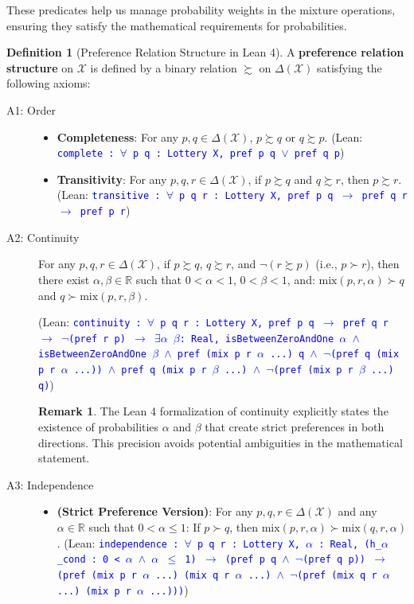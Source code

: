 \documentclass{article}
\theoremstyle{definition}
\newtheorem{definition}{Definition}[section]
\newtheorem{remark}{Remark}[section]
\newcommand{\R}{\mathbb{R}}
\newcommand{\X}{\mathcal{X}}
\newcommand{\tactic}[1]{\textcolor{blue}{\texttt{#1}}}
\newcommand{\DeltaX}{\Delta(\X)} %
\newcommand{\pref}{\succsim} %
\newcommand{\strictpref}{\succ} %
\newcommand{\mix}{\mathrm{mix}} %
\begin{document}
These predicates help us manage probability weights in the mixture operations, ensuring they satisfy the mathematical requirements for probabilities.

\begin{definition}[Preference Relation Structure in Lean 4]\label{def:prefrel_axioms}
A \textbf{preference relation structure} on $\X$ is defined by a binary relation $\pref$ on $\DeltaX$ satisfying the following axioms:
\begin{description}
    \item[A1: Order]
    \begin{itemize}
        \item \textbf{Completeness}: For any $p, q \in \DeltaX$, $p \pref q$ or $q \pref p$.
        (Lean: \tactic{complete : $\forall$ p q : Lottery X, pref p q $\vee$ pref q p})
        \item \textbf{Transitivity}: For any $p, q, r \in \DeltaX$, if $p \pref q$ and $q \pref r$, then $p \pref r$.
        (Lean: \tactic{transitive : $\forall$ p q r : Lottery X, pref p q $\rightarrow$ pref q r $\rightarrow$ pref p r})
    \end{itemize}

    \item[A2: Continuity] For any $p, q, r \in \DeltaX$, if $p \pref q$, $q \pref r$, and $\lnot(r \pref p)$ (i.e., $p \strictpref r$), then there exist $\alpha, \beta \in \R$ such that $0 < \alpha < 1$, $0 < \beta < 1$, and:
    $\mix(p, r, \alpha) \strictpref q$ and $q \strictpref \mix(p, r, \beta)$.

    (Lean: \tactic{continuity : $\forall$ p q r : Lottery X, pref p q $\rightarrow$ pref q r $\rightarrow$ $\lnot$(pref r p) $\rightarrow$ $\exists\alpha$ $\beta$: Real, isBetweenZeroAndOne $\alpha$ $\wedge$ isBetweenZeroAndOne $\beta$ $\wedge$ pref (mix p r $\alpha$ ...) q $\wedge$ $\lnot$(pref q (mix p r $\alpha$ ...)) $\wedge$ pref q (mix p r $\beta$ ...) $\wedge$ $\lnot$(pref (mix p r $\beta$ ...) q)})

    \begin{remark}
    The Lean 4 formalization of continuity explicitly states the existence of probabilities $\alpha$ and $\beta$ that create strict preferences in both directions. This precision avoids potential ambiguities in the mathematical statement.
    \end{remark}

    \item[A3: Independence]
    \begin{itemize}
        \item \textbf{(Strict Preference Version)}: For any $p, q, r \in \DeltaX$ and any $\alpha \in \R$ such that $0 < \alpha \le 1$: If $p \strictpref q$, then $\mix(p, r, \alpha) \strictpref \mix(q, r, \alpha)$.
        (Lean: \tactic{independence : $\forall$ p q r : Lottery X, $\alpha$  : Real, (h\_$\alpha$\_cond : 0 < $\alpha$ $\wedge$ $\alpha$ $\leq$ 1) $\rightarrow$ (pref p q $\wedge$ $\lnot$(pref q p)) $\rightarrow$ (pref (mix p r $\alpha$ ...) (mix q r $\alpha$ ...) $\wedge$ $\lnot$(pref (mix q r $\alpha$ ...) (mix p r $\alpha$ ...)))})


\end{itemize}
\end{description}
\end{definition}
\end{document}
